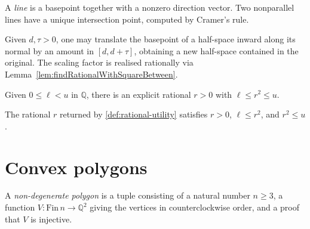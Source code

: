 \begin{definition}
  \label{def:line}
  \leanok
  A \emph{line} is a basepoint together with a nonzero direction vector.
  Two nonparallel lines have a unique intersection point, computed by
  Cramer's rule.
\end{definition}

\begin{definition}
  \label{def:moveInward}
  \leanok
  Given $d, \tau > 0$, one may translate the basepoint of a half-space
  inward along its normal by an amount in $[d, d+\tau]$, obtaining a new
  half-space contained in the original. The scaling factor is realised
  rationally via Lemma~\ref{lem:findRationalWithSquareBetween}.
\end{definition}

\begin{definition}
  \label{def:rational-utility}
  \leanok
  Given $0 \le \ell < u$ in $\mathbb{Q}$, there is an explicit rational
  $r > 0$ with $\ell \le r^2 \le u$.
\end{definition}

\begin{lemma}
  \label{lem:findRationalWithSquareBetween}
  \leanok
  The rational $r$ returned by \ref{def:rational-utility} satisfies $r > 0$,
  $\ell \le r^2$, and $r^2 \le u$.
\end{lemma}

\chapter{Convex polygons}

\begin{definition}
  \label{def:nondegen-polygon}
  \leanok
  A \emph{non-degenerate polygon} is a tuple consisting of a natural number
  $n \ge 3$, a function $V : \mathrm{Fin}\,n \to \mathbb{Q}^2$ giving the
  vertices in counterclockwise order, and a proof that $V$ is injective.
\end{definition}

